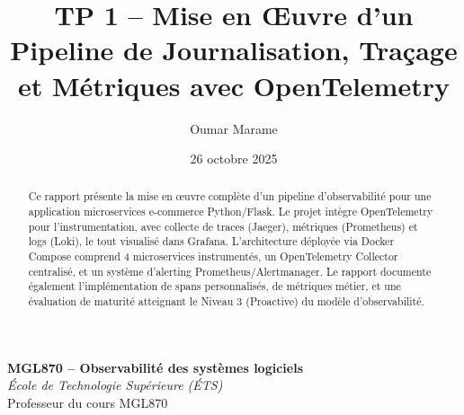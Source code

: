 \documentclass[11pt,a4paper]{article}
\title{TP 1 -- Mise en \OE uvre d'un Pipeline de Journalisation, Traçage et Métriques avec OpenTelemetry}
\author{Oumar Marame}
\date{26 octobre 2025}
\begin{document}
\maketitle
\begin{center}
\textbf{MGL870 -- Observabilité des systèmes logiciels} \\
\textit{École de Technologie Supérieure (ÉTS)} \\
Professeur du cours MGL870
\end{center}

\begin{abstract}
Ce rapport présente la mise en œuvre complète d'un pipeline d'observabilité pour une application microservices e-commerce Python/Flask. Le projet intègre OpenTelemetry pour l'instrumentation, avec collecte de traces (Jaeger), métriques (Prometheus) et logs (Loki), le tout visualisé dans Grafana. L'architecture déployée via Docker Compose comprend 4 microservices instrumentés, un OpenTelemetry Collector centralisé, et un système d'alerting Prometheus/Alertmanager. Le rapport documente également l'implémentation de spans personnalisés, de métriques métier, et une évaluation de maturité atteignant le Niveau 3 (Proactive) du modèle d'observabilité.
\end{abstract}

\tableofcontents
\newpage
\end{document}
